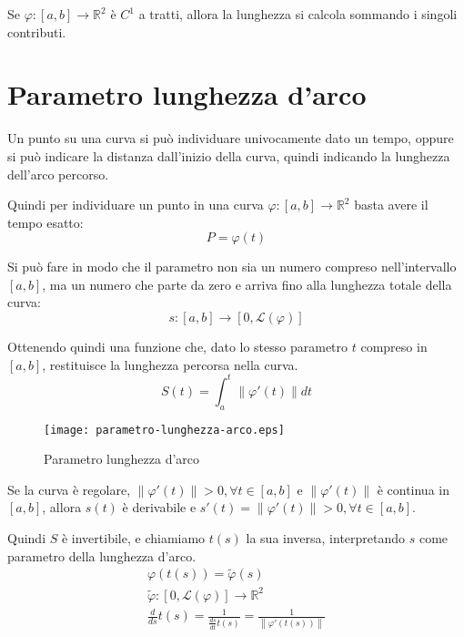 \begin{observation}
Se $\varphi:[a,b]\rightarrow\mathbb{R}^2$ è $C^1$ a tratti, allora la lunghezza si calcola sommando i singoli contributi.
\end{observation}

\section{Parametro lunghezza d'arco}
Un punto su una curva si può individuare univocamente dato un tempo, oppure si può indicare la distanza dall'inizio della curva, quindi indicando la lunghezza dell'arco percorso.

Quindi per individuare un punto in una curva $\varphi : [a, b]\rightarrow\mathbb{R}^2$ basta avere il tempo esatto:
\begin{equation}
	P=\varphi(t)
\end{equation}

Si può fare in modo che il parametro non sia un numero compreso nell'intervallo $[a, b]$, ma un numero che parte da zero e arriva fino alla lunghezza totale della curva:
\begin{equation}
	s:[a, b]\rightarrow[0, \mathcal{L}(\varphi)] 
\end{equation}

Ottenendo quindi una funzione che, dato lo stesso parametro $t$ compreso in $[a, b]$, restituisce la lunghezza percorsa nella curva.
\begin{equation}
	S(t)=\int_a^t \left\|\varphi'(t)\right\| dt
\end{equation}

\begin{figure}
	\texttt{[image: parametro-lunghezza-arco.eps]}
	\centering
	\caption{Parametro lunghezza d'arco}
\end{figure}

Se la curva è regolare, $\left\|\varphi'(t)\right\|>0, \forall t\in [a, b]$ e $\left\|\varphi'(t)\right\|$ è continua in $[a, b]$, allora $s(t)$ è derivabile e $s'(t)=\left\|\varphi'(t)\right\|>0, \forall t\in [a, b]$.

Quindi $S$ è invertibile, e chiamiamo $t(s)$ la sua inversa, interpretando $s$ come parametro della lunghezza d'arco.
\begin{gather}
	\varphi(t(s))=\tilde{\varphi}(s) \\
	\tilde{\varphi} : [0, \mathcal{L}(\varphi)]\rightarrow\mathbb{R}^2 \\
	\frac{d}{ds}t(s)=\frac{1}{\frac{ds}{dt}t(s)}=\frac{1}{\left\|\varphi'(t(s))\right\|}
\end{gather}

